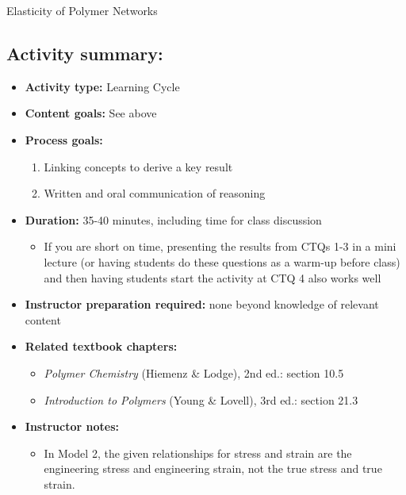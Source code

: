 \begin{activity}{Elasticity of Polymer Networks}
\begin{instructornotes}
	\subsection*{Activity summary:}
	\begin{itemize}
		\item \textbf{Activity type:} Learning Cycle
		\item \textbf{Content goals:} See above
		\item \textbf{Process goals:} %
			\begin{enumerate}
				\item Linking concepts to derive a key result
				\item Written and oral communication of reasoning
			\end{enumerate}
		\item \textbf{Duration:} 35-40 minutes, including time for class discussion
			\begin{itemize}
				\item If you are short on time, presenting the results from CTQs 1-3 in a mini lecture (or having students do these questions as a warm-up before class) and then having students start the activity at CTQ 4 also works well
			\end{itemize}
		\item \textbf{Instructor preparation required:} none beyond knowledge of relevant content
		\item \textbf{Related textbook chapters:}
			\begin{itemize}
				\item \emph{Polymer Chemistry} (Hiemenz \& Lodge), 2nd ed.: section 10.5
				\item \emph{Introduction to Polymers} (Young \& Lovell), 3rd ed.: section 21.3
			\end{itemize}
		\item \textbf{Instructor notes:}
			\begin{itemize}
				\item In Model 2, the given relationships for stress and strain are the engineering stress and engineering strain, not the true stress and true strain.
			\end{itemize}
	\end{itemize}
	
\end{instructornotes}


\begin{model}
	\label{\labelbase:mdl:macrostretch}
	

\end{model}
\end{activity}
